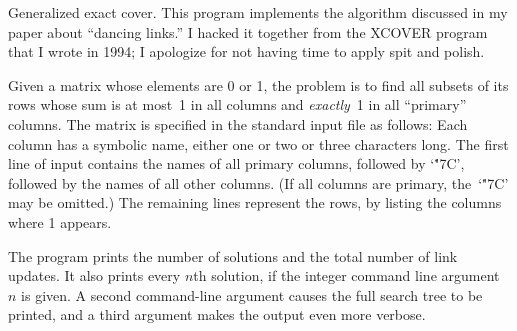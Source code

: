 
\srcloctrue
\datethis

Generalized exact cover.
This program implements the algorithm discussed in my paper about ``dancing
links.'' I hacked it together from the {\mc XCOVER} program that I wrote in
1994; I apologize for not having time to apply spit and polish.

Given a matrix whose elements are 0 or 1, the problem is to
find all subsets of its rows whose sum is at most~1 in all columns and
{\it exactly\/}~1 in all ``primary'' columns. The matrix is specified
in the standard input file as follows: Each column has a symbolic name,
either one or two or three characters long. The first line of input contains
the names of all primary columns, followed by `\.{\char"7C}', followed by
the names of all other columns.
(If all columns are primary, the~`\.{\char"7C}' may be omitted.)
The remaining lines represent the rows, by listing the columns where 1 appears.

The program prints the number of solutions and the total number of link
updates. It also prints every $n$th solution, if the integer command
line argument $n$ is given. A second command-line argument causes the
full search tree to be printed, and a third argument makes the output
even more verbose.

